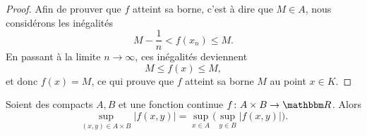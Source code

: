 \begin{proof}
	Afin de prouver que $f$ atteint sa borne, c'est à dire que $M\in A$, nous considérons les inégalités
	\begin{equation}
		M-\frac{1}{ n }<f(x_n)\leq M.
	\end{equation}
	En passant à la limite $n\to \infty$, ces inégalités deviennent
	\begin{equation}
		M\leq f(x)\leq M,
	\end{equation}
	et donc $f(x)=M$, ce qui prouve que $f$ atteint sa borne $M$ au point $x\in K$.
\end{proof}

\begin{lemma}       \label{LEMooQLVAooICaPvR}
    Soient des compacts \( A,B\) et une fonction continue \( f\colon A\times B\to \eR\). Alors
    \begin{equation}
        \sup_{(x,y)\in A\times B}| f(x,y) |=\sup_{x\in A}\big( \sup_{y\in B}| f(x,y) | \big).
    \end{equation}
\end{lemma}

